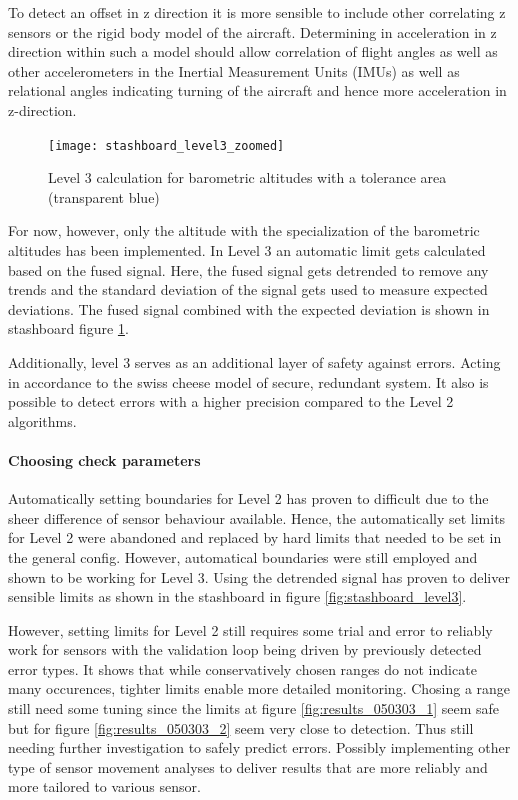 To detect an offset in z direction it is more sensible to include other correlating z sensors or the rigid body model of the aircraft. Determining in acceleration in z direction within such a model should allow correlation of flight angles as well as other accelerometers in the Inertial Measurement Units (IMUs) as well as relational angles indicating turning of the aircraft and hence more acceleration in z-direction.
\begin{figure}
    \centering
    \texttt{[image: stashboard\_level3\_zoomed]}
    \caption{Level 3 calculation for barometric altitudes with a tolerance area (transparent blue)}
    \label{fig:stashboard_level3_zoomed}
\end{figure}

For now, however, only the altitude with the specialization of the barometric altitudes has been implemented. In Level 3 an automatic limit gets calculated based on the fused signal. Here, the fused signal gets detrended to remove any trends and the standard deviation of the signal gets used to measure expected deviations. The fused signal combined with the expected deviation is shown in stashboard figure \ref{fig:stashboard_level3_zoomed}.

Additionally, level 3 serves as an additional layer of safety against errors. Acting in accordance to the swiss cheese model of secure, redundant system. It also is possible to detect errors with a higher precision compared to the Level 2 algorithms.




\paragraph{Choosing check parameters}

Automatically setting boundaries for Level 2 has proven to difficult due to the sheer difference of sensor behaviour available. Hence, the automatically set limits for Level 2 were abandoned and replaced by hard limits that needed to be set in the general config. However, automatical boundaries were still employed and shown to be working for Level 3. Using the detrended signal has proven to deliver sensible limits as shown in the stashboard in figure \ref{fig:stashboard_level3}.

However, setting limits for Level 2 still requires some trial and error to reliably work for sensors with the validation loop being driven by previously detected error types. It shows that while conservatively chosen ranges do not indicate many occurences, tighter limits enable more detailed monitoring. Chosing a range still need some tuning since the limits at figure \ref{fig:results_050303_1} seem safe but for figure \ref{fig:results_050303_2} seem very close to detection. Thus still needing further investigation to safely predict errors. Possibly implementing other type of sensor movement analyses to deliver results that are more reliably and more tailored to various sensor.

